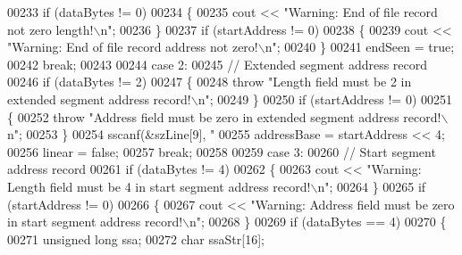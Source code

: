 \begin{DoxyCode}
{{{00233                     \textcolor{keywordflow}{if} (dataBytes != 0)
00234                     \{
00235                         cout << \textcolor{stringliteral}{"Warning: End of file record not zero length!\(\backslash\)n"};
00236                     \}
00237                     \textcolor{keywordflow}{if} (startAddress != 0)
00238                     \{
00239                         cout << \textcolor{stringliteral}{"Warning: End of file record address not zero!\(\backslash\)n"};
00240                     \}
00241                     endSeen = \textcolor{keyword}{true};
00242                     \textcolor{keywordflow}{break};
00243 
00244                 \textcolor{keywordflow}{case} 2:
00245                     \textcolor{comment}{// Extended segment address record}
00246                     \textcolor{keywordflow}{if} (dataBytes != 2)
00247                     \{
00248                         \textcolor{keywordflow}{throw} \textcolor{stringliteral}{"Length field must be 2 in extended segment address record!\(\backslash\)n"};
00249                     \}
00250                     \textcolor{keywordflow}{if} (startAddress != 0)
00251                     \{
00252                         \textcolor{keywordflow}{throw} \textcolor{stringliteral}{"Address field must be zero in extended segment address record!\(\backslash\)n"};
00253                     \}
00254                     sscanf(&szLine[9], \textcolor{stringliteral}{"%
00255                     addressBase = startAddress << 4;
00256                     linear = \textcolor{keyword}{false};
00257                     \textcolor{keywordflow}{break};
00258 
00259                 \textcolor{keywordflow}{case} 3:
00260                     \textcolor{comment}{// Start segment address record}
00261                     \textcolor{keywordflow}{if} (dataBytes != 4)
00262                     \{
00263                         cout << \textcolor{stringliteral}{"Warning: Length field must be 4 in start segment address record!\(\backslash\)n"};
00264                     \}
00265                     \textcolor{keywordflow}{if} (startAddress != 0)
00266                     \{
00267                         cout << \textcolor{stringliteral}{"Warning: Address field must be zero in start segment address record!\(\backslash\)n"};
00268                     \}
00269                     \textcolor{keywordflow}{if} (dataBytes == 4)
00270                     \{
00271                         \textcolor{keywordtype}{unsigned} \textcolor{keywordtype}{long} ssa;
00272                         \textcolor{keywordtype}{char}    ssaStr[16];
}}}}
\end{DoxyCode}
